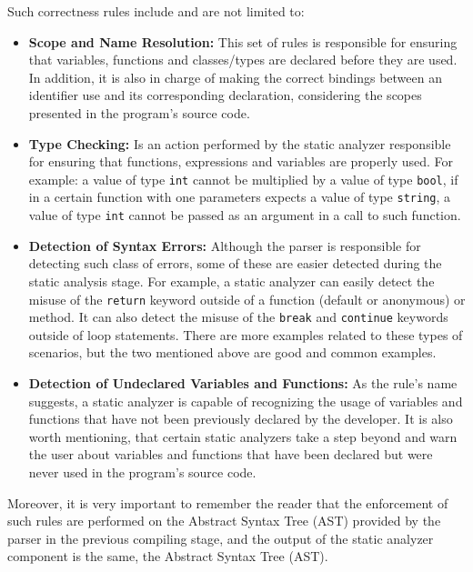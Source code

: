 Such correctness rules include and are not limited to:
\begin{itemize}
    \item \textbf{Scope and Name Resolution:} This set of rules is responsible for ensuring that variables, functions and classes/types are declared before they are used. In addition, it is also in charge of making the correct bindings between an identifier use and its corresponding declaration, considering the scopes presented in the program's source code.
    
    \item \textbf{Type Checking:} Is an action performed by the static analyzer responsible for ensuring that functions, expressions and variables are properly used. For example: a value of type \texttt{int} cannot be multiplied by a value of type \texttt{bool}, if in a certain function with one parameters expects a value of type \texttt{string}, a value of type \texttt{int} cannot be passed as an argument in a call to such function.
    
    \item \textbf{Detection of Syntax Errors:} Although the parser is responsible for detecting such class of errors, some of these are easier detected during the static analysis stage. For example, a static analyzer can easily detect the misuse of the \texttt{return} keyword outside of a function (default or anonymous) or method. It can also detect the misuse of the \texttt{break} and \texttt{continue} keywords outside of loop statements. There are more examples related to these types of scenarios, but the two mentioned above are good and common examples.
    
    \item \textbf{Detection of Undeclared Variables and Functions:} As the rule's name suggests, a static analyzer is capable of recognizing the usage of variables and functions that have not been previously declared by the developer. It is also worth mentioning, that certain static analyzers take a step beyond and warn the user about variables and functions that have been declared but were never used in the program's source code.
\end{itemize}

Moreover, it is very important to remember the reader that the enforcement of such rules are performed on the Abstract Syntax Tree (AST) provided by the parser in the previous compiling stage, and the output of the static analyzer component is the same, the Abstract Syntax Tree (AST).

